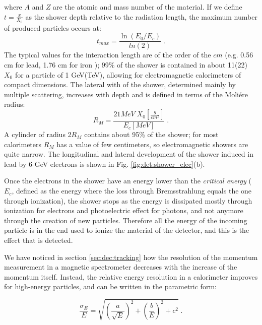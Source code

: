 where $A$ and $Z$ are the atomic and mass number of the material. If we define $t = \frac{x}{X_0}$ as the shower depth relative to the radiation length, the maximum number of produced particles occurs at:
\begin{equation}
t_{max} = \frac{\ln \left(E_0/E_c\right)}{ln\left(2\right)} \;.
\end{equation}
The typical values for the interaction length are of the order of the $cm$ (e.g. 0.56 cm for lead, 1.76 cm for iron \cite{Patrignani:2016xqp}); 99\% of the shower is contained in about 11(22) $X_0$ for a particle of 1 GeV(TeV), allowing for electromagnetic calorimeters of compact dimensions. 
The lateral with of the shower, determined mainly by multiple scattering, increases with depth and is defined in terms of the Moli\'ere radius:
\begin{equation}
R_M = \frac{21 MeV \; X_0[\frac{g}{cm^2}]}{E_c [MeV]} \; .
\end{equation}
A cylinder of radius 2$R_M$ contains about 95\% of the shower; for most calorimeters $R_M$ has a value of few centimeters, so electromagnetic showers are quite narrow. The longitudinal and lateral development of the shower induced in lead by 6-GeV electrons is shown in Fig. \ref{fig:det:shower_elec}(b).

Once the electrons in the shower have an energy lower than the \textit{critical energy} ($E_c$, defined as the energy where the loss through Bremsstrahlung equals the one through ionization), the shower stops as the energy is dissipated mostly through ionization for electrons and photoelectric effect for photons, and not anymore through the creation of new particles. Therefore all the energy of the incoming particle is in the end used to ionize the material of the detector, and this is the effect that is detected.


We have noticed in section \ref{sec:dec:tracking} how the resolution of the momentum measurement in a magnetic spectrometer decreases with the increase of the momentum itself. Instead, the relative energy resolution in a calorimeter improves for high-energy particles, and can be written in the parametric form:

\begin{equation}
\frac{\sigma_E}{E} = \sqrt{\left(\frac{a}{\sqrt{E}} \right)^2 + \left( \frac{b}{E} \right)^2 + c^2 } \; .
\end{equation}

